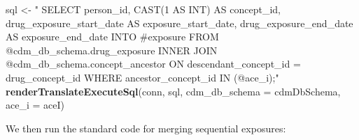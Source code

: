 \documentclass[11pt]{book}
\newenvironment{Shaded}{\begin{snugshade}}{\end{snugshade}}
\newcommand{\DataTypeTok}[1]{\textcolor[rgb]{0.13,0.29,0.53}{#1}}
\newcommand{\KeywordTok}[1]{\textcolor[rgb]{0.13,0.29,0.53}{\textbf{#1}}}
\newcommand{\NormalTok}[1]{#1}
\newcommand{\StringTok}[1]{\textcolor[rgb]{0.31,0.60,0.02}{#1}}
\theoremstyle{definition}
\theoremstyle{definition}
\theoremstyle{definition}
\theoremstyle{remark}
\begin{document}
\begin{Shaded}
\begin{Highlighting}[]
\NormalTok{sql <-}\StringTok{ "}
\StringTok{  SELECT person_id,}
\StringTok{    CAST(1 AS INT) AS concept_id,}
\StringTok{    drug_exposure_start_date AS exposure_start_date,}
\StringTok{    drug_exposure_end_date AS exposure_end_date}
\StringTok{  INTO #exposure}
\StringTok{  FROM @cdm_db_schema.drug_exposure}
\StringTok{  INNER JOIN @cdm_db_schema.concept_ancestor}
\StringTok{    ON descendant_concept_id = drug_concept_id}
\StringTok{  WHERE ancestor_concept_id IN (@ace_i);"}
\KeywordTok{renderTranslateExecuteSql}\NormalTok{(conn,}
\NormalTok{                          sql, }
                          \DataTypeTok{cdm_db_schema =}\NormalTok{ cdmDbSchema, }
                          \DataTypeTok{ace_i =}\NormalTok{ aceI)}
\end{Highlighting}
\end{Shaded}

We then run the standard code for merging sequential exposures:
\end{document}
